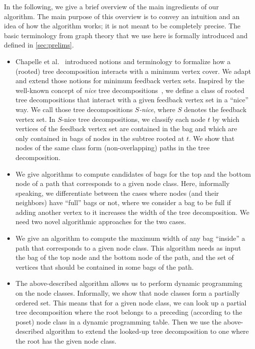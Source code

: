\documentclass[a4paper,UKenglish,cleveref, autoref, thm-restate, numberwithinsect]{lipics-v2021}
\newcounter{algorithm}
\begin{document}
In the following, we give a brief overview of the main ingredients of our algorithm.
The main purpose of this overview is to convey an intuition and an idea of how the algorithm works; it is not meant to be completely precise. 
The basic terminology from graph theory that we use here is formally introduced and defined in \cref{sec:prelims}.
\begin{itemize}
\item Chapelle et al.~\cite{chapelle2017treewidth} introduced notions and terminology to formalize how a (rooted) tree decomposition interacts with a minimum vertex cover. We adapt and extend those notions for minimum feedback vertex sets. Inspired by the well-known concept of \emph{nice} tree decompositions~\cite{bodlaender1996efficient}, we define a class of rooted tree decompositions that interact with a given feedback vertex set in a ``nice'' way. We call those tree decompositions \emph{$S$-nice}, where $S$ denotes the feedback vertex set.
In $S$-nice tree decompositions, we classify each node $t$ by which vertices of the feedback vertex set are contained in the bag and which are only contained in bags of nodes in the subtree rooted at $t$. We show that nodes of the same class form (non-overlapping) paths in the tree decomposition.
\item We give algorithms to compute candidates of bags for the top and the bottom node of a path that corresponds to a given node class. Here, informally speaking, we differentiate between the cases where nodes (and their neighbors) have ``full'' bags or not, where we consider a bag to be full if adding another vertex to it increases the width of the tree decomposition. We need two novel algorithmic approaches for the two cases.
\item We give an algorithm to compute the maximum width of any bag ``inside'' a path that corresponds to a given node class. This algorithm needs as input the bag of the top node and the bottom node of the path, and the set of vertices that should be contained in some bags of the path.
\item The above-described algorithm allows us to perform dynamic programming on the node classes. Informally, we show that node classes form a partially ordered set. This means that for a given node class, we can look up a partial tree decomposition where the root belongs to a preceding (according to the poset) node class in a dynamic programming table. Then we use the above-described algorithm to extend the looked-up tree decomposition to one where the root has the given node class.
\end{itemize}
\end{document}
